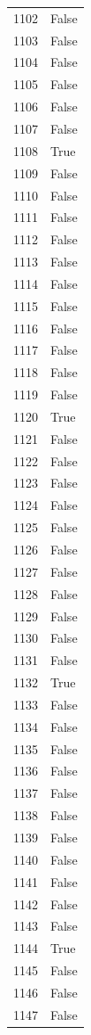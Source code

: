 \documentclass[
  letterpaper,
  DIV=11,
  numbers=noendperiod]{scrreprt}
\begin{document}
\begin{tabular}{ll}
1102 &  False \\
1103 &  False \\
1104 &  False \\
1105 &  False \\
1106 &  False \\
1107 &  False \\
1108 &   True \\
1109 &  False \\
1110 &  False \\
1111 &  False \\
1112 &  False \\
1113 &  False \\
1114 &  False \\
1115 &  False \\
1116 &  False \\
1117 &  False \\
1118 &  False \\
1119 &  False \\
1120 &   True \\
1121 &  False \\
1122 &  False \\
1123 &  False \\
1124 &  False \\
1125 &  False \\
1126 &  False \\
1127 &  False \\
1128 &  False \\
1129 &  False \\
1130 &  False \\
1131 &  False \\
1132 &   True \\
1133 &  False \\
1134 &  False \\
1135 &  False \\
1136 &  False \\
1137 &  False \\
1138 &  False \\
1139 &  False \\
1140 &  False \\
1141 &  False \\
1142 &  False \\
1143 &  False \\
1144 &   True \\
1145 &  False \\
1146 &  False \\
1147 &  False \\

\end{tabular}
\end{document}
